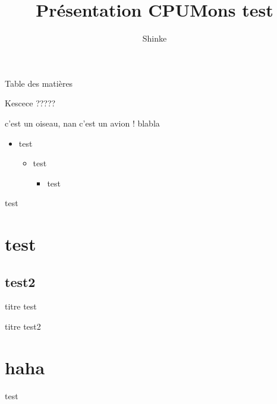 \documentclass{beamer}
\title{Présentation CPUMons test}
\author{Shinke}
\begin{document}
\begin{frame}
\titlepage
\end{frame}
\begin{frame}{Table des matières}
    \tableofcontents
\end{frame}
\begin{frame}{Kescece ?????}
\begin{tcolorbox}[title=définition]
c'est un oiseau, nan c'est un avion !
\tcblower
blabla
\end{tcolorbox}
\begin{itemize}
    \item test
    \begin{itemize}
        \item test
        \begin{itemize}
            \item test
        \end{itemize}
    \end{itemize}
\end{itemize}
\end{frame}
\begin{frame}{test}
\section{test}
\subsection{test2}
    \begin{block}{titre}
        test
    \end{block}
    \begin{alertblock}{titre}
        test2
    \end{alertblock}
\end{frame}
\section{haha}
\begin{frame}{test}
    
\end{frame}
\end{document}
